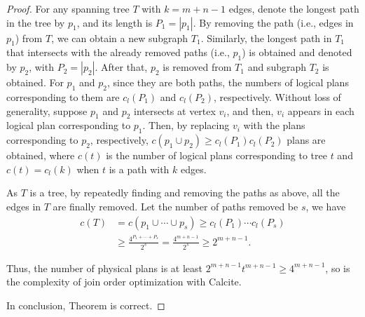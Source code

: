 \begin{proof}
    For any spanning tree $T$ with $k = m + n - 1$ edges, denote the longest path in the tree by $p_1$, and its length is $P_1 = |p_1|$.
    By removing the path (i.e., edges in $p_1$) from $T$, we can obtain a new subgraph $T_1$.
    Similarly, the longest path in $T_1$ that intersects with the already removed paths (i.e., $p_1$) is obtained and denoted by $p_2$, with $P_2 = |p_2|$.
    After that, $p_2$ is removed from $T_1$ and subgraph $T_2$ is obtained.
    For $p_1$ and $p_2$, since they are both paths, the numbers of logical plans corresponding to them are $c_l(P_1)$ and $c_l(P_2)$, respectively.
    Without loss of generality, suppose $p_1$ and $p_2$ intersects at vertex $v_i$, and then, $v_i$ appears in each logical plan corresponding to $p_1$.
    Then, by replacing $v_i$ with the plans corresponding to $p_2$, respectively, $c(p_1 \cup p_2) \geq c_l(P_1)c_l(P_2)$ plans are obtained, where $c(t)$ is the number of logical plans corresponding to tree $t$ and $c(t) = c_l(k)$ when $t$ is a path with $k$ edges.

    As $T$ is a tree, by repeatedly finding and removing the paths as above, all the edges in $T$ are finally removed.
    Let the number of paths removed be $s$, we have
    \begin{equation*}
        \begin{split}
            c(T) & = c(p_1 \cup \cdots \cup p_s) \geq c_l(P_1) \cdots c_l(P_s) \\
            & \geq \frac{4^{P_1 + \cdots + P_s}}{2^s} = \frac{4^{m + n - 1}}{2^s} \geq 2^{m+n-1}.
        \end{split}
    \end{equation*}



    Thus, the number of physical plans is at least $2^{m+n-1}t^{m+n-1} \geq 4^{m+n-1}$, so is the complexity of join order optimization with Calcite.

    In conclusion, Theorem  is correct.
\end{proof}


